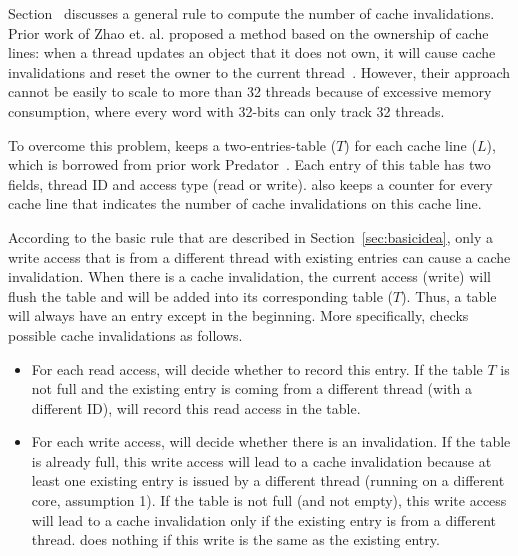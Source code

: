 Section~\cite{sec:detect} discusses a general rule to compute the number of cache invalidations. Prior work of Zhao et. al. proposed a method based on the ownership of cache lines: when a thread updates an object that it does not own, it will cause cache invalidations and reset the owner to the current thread~\cite{qinzhao}. However, their approach cannot be easily to scale to more than 32 threads because of excessive memory consumption, where every word with 32-bits can only track 32 threads.  

To overcome this problem, \Cheetah{} keeps a two-entries-table ($T$) for each cache line ($L$), which is borrowed from prior work Predator~\cite{Predator}. Each entry of this table has two fields,   thread ID and access type (read or write). \Cheetah{} also keeps a counter for every cache line that indicates the number of cache invalidations on this cache line.  

According to the basic rule that are described in Section~\ref{sec:basicidea}, only a write access that is from a different thread with existing entries can cause a cache invalidation. When there is a cache invalidation, the current access (write) will flush the table and will be added into its corresponding table ($T$). Thus, a table will always have an entry except in the beginning. More specifically, \cheetah{} checks possible cache invalidations as follows.
 
\begin{itemize}
\item
  For each read access, \cheetah{} will decide whether to record this entry. If the table $T$ is not full and the existing entry is coming from a different thread (with a different ID), \cheetah{} will record this read access in the table.
  
  \item
  For each write access, \cheetah{} will decide whether there is an invalidation. If the table is already full, this write access will lead to a cache invalidation because at least one existing entry is issued by a different thread (running on a different core, assumption 1). If the table is not full (and not empty), this write access will lead to a cache invalidation only if the existing entry is from a different thread. \cheetah{} does nothing if this write is the same as the existing entry. 
  
\end{itemize}
     

